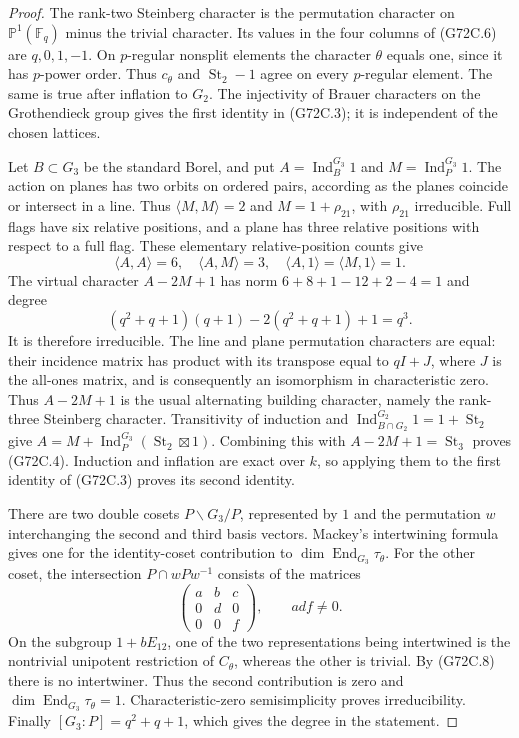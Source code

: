 \begin{proof}
The rank-two Steinberg character is the permutation character
on $\mathbb P^1(\mathbb F_q)$ minus the trivial character.  Its
values in the four columns of (G72C.6) are $q,0,1,-1$.
On $p$-regular nonsplit elements the character $\theta$ equals
one, since it has $p$-power order.  Thus $c_\theta$ and
$\operatorname{St}_2-1$ agree on every $p$-regular element.
The same is true after inflation to $G_2$.  The injectivity of
Brauer characters on the Grothendieck group gives the first
identity in (G72C.3); it is independent of the chosen lattices.

Let $B\subset G_3$ be the standard Borel, and put
$A=\operatorname{Ind}_{B}^{G_3}1$ and
$M=\operatorname{Ind}_{P}^{G_3}1$.
The action on planes has two orbits on ordered pairs, according
as the planes coincide or intersect in a line.  Thus
$\langle M,M\rangle=2$ and $M=1+\rho_{21}$, with
$\rho_{21}$ irreducible.  Full flags have six relative positions,
and a plane has three relative positions with respect to a full
flag.  These elementary relative-position counts give
\[
 \langle A,A\rangle=6,\quad
 \langle A,M\rangle=3,\quad
 \langle A,1\rangle=\langle M,1\rangle=1.                 \tag{G72C.9}
\]
The virtual character $A-2M+1$ has norm
$6+8+1-12+2-4=1$ and degree
\[
 (q^2+q+1)(q+1)-2(q^2+q+1)+1=q^3.
\]
It is therefore irreducible.  The line and plane permutation
characters are equal: their incidence matrix has product with
its transpose equal to $qI+J$, where $J$ is the all-ones matrix,
and is consequently an isomorphism in characteristic zero.
Thus $A-2M+1$ is the usual alternating building character,
namely the rank-three Steinberg character.  Transitivity of induction and
$\operatorname{Ind}_{B\cap G_2}^{G_2}1=1+\operatorname{St}_2$
give
$A=M+\operatorname{Ind}_{P}^{G_3}(\operatorname{St}_2\boxtimes1)$.
Combining this with $A-2M+1=\operatorname{St}_3$ proves (G72C.4).
Induction and inflation are exact over $k$, so applying them
to the first identity of (G72C.3) proves its second identity.

There are two double cosets $P\backslash G_3/P$, represented by
$1$ and the permutation $w$ interchanging the second and third
basis vectors.  Mackey's intertwining formula gives one for the
identity-coset contribution to
$\dim\operatorname{End}_{G_3}\tau_\theta$.
For the other coset, the intersection $P\cap wPw^{-1}$ consists
of the matrices
\[
 \begin{pmatrix}a&b&c\\0&d&0\\0&0&f\end{pmatrix},
                         \qquad a d f\ne0.               \tag{G72C.10}
\]
On the subgroup $1+bE_{12}$, one of the two representations
being intertwined is the nontrivial unipotent restriction of
$C_\theta$, whereas the other is trivial.  By (G72C.8) there is
no intertwiner.  Thus the second contribution is zero and
$\dim\operatorname{End}_{G_3}\tau_\theta=1$.
Characteristic-zero semisimplicity proves irreducibility.
Finally $[G_3:P]=q^2+q+1$, which gives the degree in the statement.
\end{proof}

